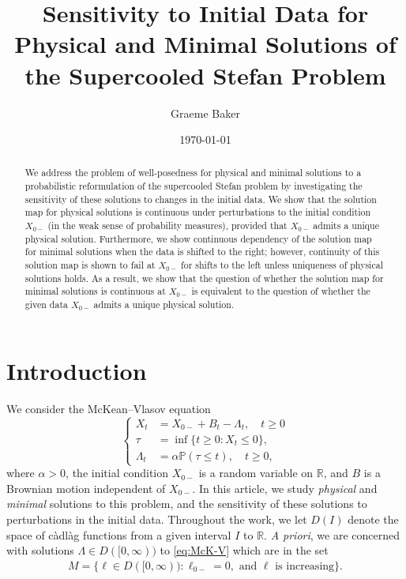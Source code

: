 \documentclass[12pt]{amsart}
\title[Sensitivity to Initial Data for the Supercooled Stefan Problem]{Sensitivity to Initial Data for Physical and Minimal Solutions of the Supercooled Stefan Problem}
\author{Graeme Baker}
\date{\today}
\newcommand{\R}{\mathbb{R}}
\newcommand{\bP}{\mathbb{P}}
\theoremstyle{plain}
\theoremstyle{definition}
\begin{document}
\begin{abstract}
We address the problem of well-posedness for physical and minimal solutions to a probabilistic reformulation of the supercooled Stefan problem by investigating the sensitivity of these solutions to changes in the initial data.
We show that the solution map for physical solutions is continuous under perturbations to the initial condition $X_{0-}$ (in the weak sense of probability measures), provided that $X_{0-}$ admits a unique physical solution.
Furthermore, we show continuous dependency of the solution map for minimal solutions when the data is shifted to the right; however, continuity of this solution map is shown to fail at $X_{0-}$ for shifts to the left unless uniqueness of physical solutions holds.
As a result, we show that the question of whether the solution map for minimal solutions is continuous at $X_{0-}$ is equivalent to the question of whether the given data $X_{0-}$ admits a unique physical solution.
\end{abstract}

\maketitle

\section{Introduction}

We consider the McKean--Vlasov equation
\begin{equation}\label{eq:McK-V}
\left\{
\begin{aligned}
    X_t&=X_{0-}+B_t-\Lambda_t,\quad t\ge 0\\
    \tau &= \inf \{t\ge 0: X_t\le 0\},\\
    \Lambda_t&=\alpha\bP(\tau\le t),\quad t\ge 0,
\end{aligned}
\right.
\end{equation}
where $\alpha>0$, the initial condition $X_{0-}$ is a random variable on $\R$, and $B$ is a Brownian motion independent of $X_{0-}$. In this article, we study \emph{physical} and \emph{minimal} solutions to this problem, and the sensitivity of these solutions to perturbations in the initial data. Throughout the work, we let $D(I)$ denote the space of c\`adl\`ag functions from a given interval $I$ to $\R$. \emph{A priori}, we are concerned with solutions $\Lambda\in D([0,\infty))$ to \eqref{eq:McK-V} which are in the set
\begin{align}
M=\{\ell\in D([0,\infty)):\ell_{0-}=0,\text{ and }\ell\text{ is increasing}\}.
\end{align}
\end{document}
